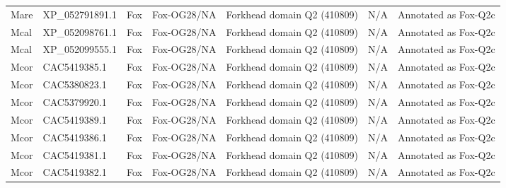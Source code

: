 \documentclass[../main.tex]{subfiles}
\begin{document}
\begin{landscape}
\begin{longtable}{lllllll}
		Mare           & XP\_052791891.1       & Fox            & Fox-OG28/NA         & Forkhead domain Q2 (410809)                 & N/A                                                                    & Annotated as Fox-Q2c \\
		Mcal           & XP\_052098761.1       & Fox            & Fox-OG28/NA         & Forkhead domain Q2 (410809)                 & N/A                                                                    & Annotated as Fox-Q2c \\
		Mcal           & XP\_052099555.1       & Fox            & Fox-OG28/NA         & Forkhead domain Q2 (410809)                 & N/A                                                                    & Annotated as Fox-Q2c \\
		Mcor           & CAC5419385.1          & Fox            & Fox-OG28/NA         & Forkhead domain Q2 (410809)                 & N/A                                                                    & Annotated as Fox-Q2c \\
		Mcor           & CAC5380823.1          & Fox            & Fox-OG28/NA         & Forkhead domain Q2 (410809)                 & N/A                                                                    & Annotated as Fox-Q2c \\
		Mcor           & CAC5379920.1          & Fox            & Fox-OG28/NA         & Forkhead domain Q2 (410809)                 & N/A                                                                    & Annotated as Fox-Q2c \\
		Mcor           & CAC5419389.1          & Fox            & Fox-OG28/NA         & Forkhead domain Q2 (410809)                 & N/A                                                                    & Annotated as Fox-Q2c \\
		Mcor           & CAC5419386.1          & Fox            & Fox-OG28/NA         & Forkhead domain Q2 (410809)                 & N/A                                                                    & Annotated as Fox-Q2c \\
		Mcor           & CAC5419381.1          & Fox            & Fox-OG28/NA         & Forkhead domain Q2 (410809)                 & N/A                                                                    & Annotated as Fox-Q2c \\
		Mcor           & CAC5419382.1          & Fox            & Fox-OG28/NA         & Forkhead domain Q2 (410809)                 & N/A                                                                    & Annotated as Fox-Q2c \\

\end{longtable}
\end{landscape}
\end{document}
